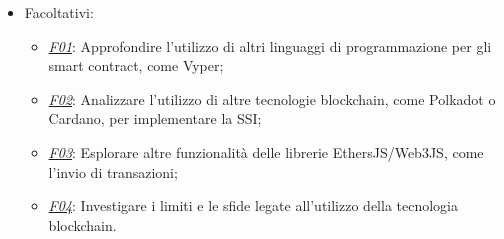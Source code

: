 \begin{itemize}
    \item Facoltativi:
        \begin{itemize}
            \item \underline{\textit{F01}}: Approfondire l'utilizzo di altri linguaggi di programmazione per gli smart contract, come Vyper;
            \item \underline{\textit{F02}}: Analizzare l'utilizzo di altre tecnologie blockchain, come Polkadot o Cardano, per implementare la SSI;
            \item \underline{\textit{F03}}: Esplorare altre funzionalità delle librerie EthersJS/Web3JS, come l'invio di transazioni;
            \item \underline{\textit{F04}}: Investigare i limiti e le sfide legate all'utilizzo della tecnologia blockchain.
        \end{itemize}
    
\end{itemize}